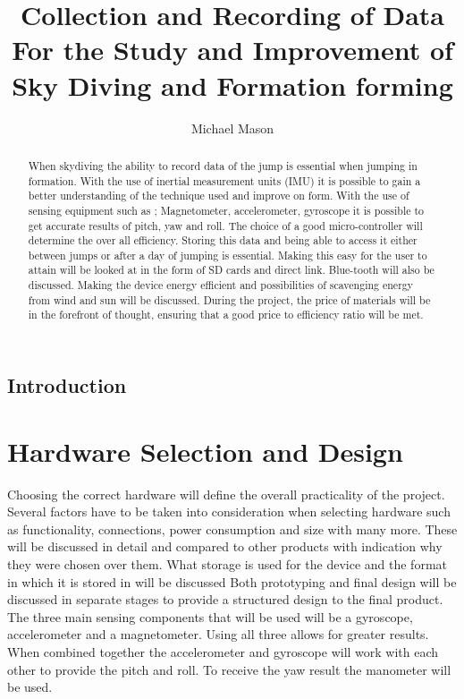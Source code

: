 \documentclass{report}
\begin{document}
\title{Collection and Recording of Data For the Study and Improvement of Sky Diving and Formation forming}
\author{Michael Mason}

\maketitle
\begin{abstract}
When skydiving the ability to record data of the jump is essential when jumping in formation. With the use of inertial measurement units (IMU) it is possible to gain a better understanding of the technique used and improve on form. With the use of sensing equipment such as ; Magnetometer, accelerometer, gyroscope it is possible to get accurate results of pitch, yaw and roll. The choice of a good micro-controller will determine the over all efficiency.
Storing this data and being able to access it either between jumps or after a day of jumping is essential. Making this easy for the user to attain will be looked at in the form of SD cards and direct link. Blue-tooth will also be discussed.
Making the device energy efficient and possibilities of scavenging energy from wind and sun will be discussed. During the project, the price of materials will be in the forefront of thought, ensuring that a good price to efficiency ratio will be met.

\end{abstract}

\tableofcontents

\newpage

\section{Introduction}


\chapter{Hardware Selection and Design}
Choosing the correct hardware will define the overall practicality of the project. Several factors have to be taken into consideration when selecting hardware such as functionality, connections, power consumption and size with many more. These will be discussed in detail and compared to other products with indication why they were chosen over them. What storage is used for the device and the format in which it is stored in will be discussed
Both prototyping and final design will be discussed in separate stages to provide a structured design to the final product.
The three main sensing components that will be used will be a gyroscope, accelerometer and a magnetometer. Using all three allows for greater results. When combined together the accelerometer and gyroscope will work with each other to provide the pitch and roll. To receive the yaw result the manometer will be used.
\end{document}
